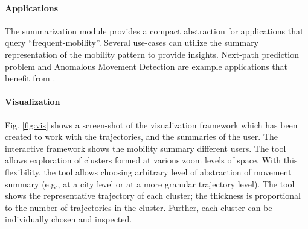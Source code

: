 \paragraph{Applications}
The summarization module provides a compact abstraction for applications that query ``frequent-mobility''. Several use-cases can utilize the summary representation of the mobility pattern to provide insights. Next-path prediction problem and Anomalous Movement Detection are example applications that benefit from \trajSummary.

\paragraph{Visualization}
\label{sec:vis}
Fig. \ref{fig:vis} shows a screen-shot of the visualization framework which has been created to work with the trajectories, and the summaries of the user. The interactive framework shows the mobility summary different users. The tool allows exploration of clusters formed at various zoom levels of space. With this flexibility, the tool allows choosing arbitrary level of abstraction of movement summary (e.g., at a city level or at a more granular trajectory level). 
The tool shows the representative trajectory of each cluster; the thickness is proportional to the number of trajectories in the cluster. Further, each cluster can be individually chosen and inspected. 

